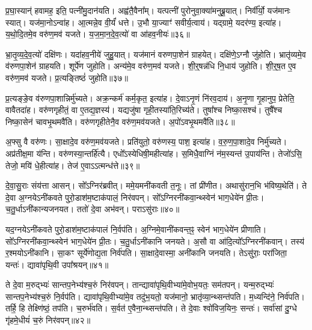 प्र॒घा॒स्यान्॑ हवामह॒ इति॒ पत्नी॑मु॒दान॑यति।
अह्व॑तै॒वैना᳚म्।
यत्पत्नी॑ पुरोनुवा॒क्या॑मनुब्रू॒यात्।
निर्वी᳚र्यो॒ यज॑मानः स्यात्।
यज॑मा॒नो\-ऽन्वा॑ह।
आ॒त्मन्ने॒व वी॒र्यं॑ धत्ते।
उ॒भौ या॒ज्याꣳ॑ सवीर्य॒त्वाय॑।
यद्ग्रामे॒ यदर॑ण्य॒ इत्या॑ह।
य॒थो॒दि॒तमे॒व वरु॑ण॒मव॑ यजते।
य॒ज॒मा॒न॒दे॒व॒त्यो॑ वा आ॑हव॒नीयः॑॥३६॥\ip

भ्रा॒तृ॒व्य॒दे॒व॒त्यो॑ दक्षि॑णः।
यदा॑हव॒नीये॑ जुहु॒यात्।
यज॑मानं वरुणपा॒शेन॑ ग्राहयेत्।
दक्षि॑णे॒\-ऽग्नौ जु॑होति।
भ्रातृ॑व्यमे॒व व॑रुणपा॒शेन॑ ग्राहयति।
शूर्पे॑ण जुहोति।
अन्य॑मे॒व वरु॑ण॒मव॑ यजते।
शी॒र्॒षन्न॑धि नि॒धाय॑ जुहोति।
शी॒र्॒\mbox{}ष॒त ए॒व वरु॑ण॒मव॑ यजते।
प्र॒त्यङ्तिष्ठं॑ जुहोति॥३७॥\ip

प्र॒त्यङ्ङे॒व व॑रुणपा॒शान्निर्मु॑च्यते।
अक्र॒न्कर्म॑ कर्म॒कृत॒ इत्या॑ह।
दे॒वा\-ऽनृ॒णं नि॑रव॒दाय॑।
अ॒नृ॒णा गृ॒हानुप॒ प्रेतेति॒ वावैतदा॑ह।
वरु॑णगृहीतं॒ वा ए॒तद्य॒ज्ञस्य॑।
यद्यजु॑षा गृही॒तस्या॑ति॒\-रिच्य॑ते।
तुषा᳚श्च निष्का॒सश्च॑।
तुषै᳚श्च निष्का॒सेन॑ चावभृ॒थमवै॑ति।
वरु॑णगृहीतेनै॒व वरु॑ण॒मव॑यजते।
अ॒पो॑\-ऽवभृ॒थमवै॑ति॥३८॥\ip

अ॒फ्सु वै वरु॑णः।
सा॒क्षादे॒व वरु॑ण॒मव॑यजते।
प्रति॑\-युतो॒ वरु॑णस्य॒ पाश॒ इत्या॑ह।
व॒रु॒ण॒पा॒शादे॒व निर्मु॑च्यते।
अप्र॑तीक्ष॒मा य॑न्ति।
वरु॑णस्या॒न्तर्\mbox{}हि॑त्यै।
एधो᳚ऽस्येधिषी॒मही\-त्या॑ह।
स॒मिधै॒वाग्निं न॑म॒स्यन्त॑ उ॒पाय॑न्ति।
तेजो॑ऽसि॒ तेजो॒ मयि॑ धे॒हीत्या॑ह।
तेज॑ ए॒वाऽऽत्मन्ध॑त्ते॥३९॥\ip{}

दे॒वा॒सु॒राः संय॑त्ता आसन्।
सो᳚ऽग्निर॑ब्रवीत्।
ममे॒यमनी॑क\-वती त॒नूः।
तां प्री॑णीत।
अथासु॑रान॒भि भ॑विष्य॒थेति॑।
ते दे॒वा अ॒ग्नये\-ऽनी॑कवते पुरो॒डाश॑म॒ष्टा\-क॑पालं॒ निर॑वपन्।
सो᳚ऽग्निरनी॑कवा॒न्थ्स्वेन॑ भाग॒धेये॑न प्री॒तः।
च॒तु॒र्धा\-ऽनी॑कान्य\-जनयत।
ततो॑ दे॒वा अभ॑वन्।
पराऽसु॑राः॥४०॥\ip

यद॒ग्नये\-ऽनी॑कवते पुरो॒डाश॑म॒ष्टा\-क॑पालं नि॒र्वप॑ति।
अ॒ग्निमे॒वा\-नी॑क\-वन्त॒ꣴ॒ स्वेन॑ भाग॒धेये॑न प्रीणाति।
सो᳚ऽग्निरनी॑कवा॒न्थ्स्वेन॑ भाग॒धेये॑न प्री॒तः।
च॒तु॒र्धा\-ऽनी॑कानि जनयते।
अ॒सौ वा आ॑दि॒त्यो᳚\-ऽग्निरनी॑कवान्।
तस्य॑ र॒श्मयो\-ऽनी॑कानि।
सा॒कꣳ सूर्ये॑णोद्य॒ता निर्व॑पति।
सा॒क्षादे॒वास्मा॒ अनी॑कानि जनयति।
तेऽसु॑राः॒ परा॑जिता॒ यन्तः॑।
द्यावा॑पृथि॒वी उपा᳚श्रयन्॥४१॥\ip

ते दे॒वा म॒रुद्भ्यः॑ सान्तप॒नेभ्य॑श्च॒रुं निर॑वपन्।
तान्द्यावा॑पृथि॒वी\-भ्या॑मे॒वोभ॒यतः॒ सम॑तपन्।
यन्म॒रुद्भ्यः॑ सान्तप॒नेभ्य॑श्च॒रुं नि॒र्वप॑ति।
द्यावा॑पृथि॒वीभ्या॑मे॒व तदु॑भ॒यतो॒ यज॑मानो॒ भ्रातृ॑व्या॒न्थ्सन्त॑पति।
म॒ध्यन्दि॑ने॒ निर्व॑पति।
तर्\mbox{}हि॒ हि तेक्ष्णि॑ष्ठं॒ तप॑ति।
च॒रुर्भ॑वति।
स॒र्वत॑ ए॒वैना॒न्थ्सन्त॑पति।
ते दे॒वाः श्वो॑विज॒यिनः॒ सन्तः॑।
सर्वा॑सां दु॒ग्धे गृ॑हमे॒धीयं॑ च॒रुं निर॑वपन्॥४२॥\ip

